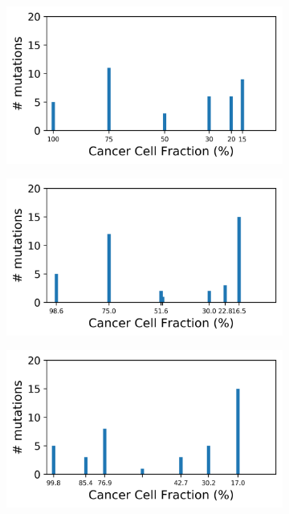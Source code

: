 \documentclass{article}
\begin{document}
\begin{figure}[h]
	\centering
	\begin{subfigure}[t]{0.32\linewidth}
		\centering
		\includegraphics[width = 1.0\linewidth, trim={0 0 0 0}, clip=true]{pyclone_analysis_simdeep/realcols.png}
		\subcaption{}
	\end{subfigure}%
	\hspace{0.01 \linewidth}
	\begin{subfigure}[t]{0.32\linewidth}
		\centering
		\includegraphics[width = 1.0\linewidth, trim={0 0 0 0}, clip=true]{pyclone_analysis_simdeep/cols.png}
		\subcaption{}	
	\end{subfigure}%
	\hspace{0.01 \linewidth}
	\begin{subfigure}[t]{0.32\linewidth}
		\centering
		\includegraphics[width = 1.0\linewidth, trim={0 0 0 0}, clip=true]{ccube_analysis_simdeep/cols.png}

\end{subfigure}
\end{figure}
\end{document}
